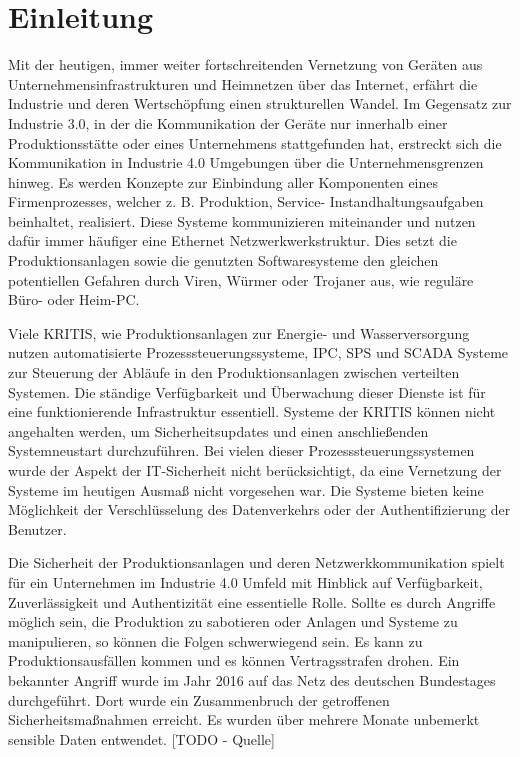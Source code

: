 \chapter{Einleitung}
Mit der heutigen, immer weiter fortschreitenden Vernetzung von Geräten aus Unternehmensinfrastrukturen und Heimnetzen über das Internet, erfährt die Industrie und deren Wertschöpfung einen strukturellen Wandel. Im Gegensatz zur Industrie 3.0, in der die Kommunikation der Geräte nur innerhalb einer Produktionsstätte oder eines Unternehmens stattgefunden hat, erstreckt sich die Kommunikation in Industrie 4.0 Umgebungen über die Unternehmensgrenzen hinweg. Es werden Konzepte zur Einbindung aller Komponenten eines Firmenprozesses, welcher z. B. Produktion, Service- Instandhaltungsaufgaben beinhaltet, realisiert. Diese Systeme kommunizieren miteinander und nutzen dafür immer häufiger eine Ethernet Netzwerkwerkstruktur. Dies setzt die Produktionsanlagen sowie die genutzten Softwaresysteme den gleichen potentiellen Gefahren durch Viren, Würmer oder Trojaner aus, wie reguläre Büro- oder Heim-PC.

Viele \ac{KRITIS}, wie Produktionsanlagen zur Energie- und Wasserversorgung nutzen automatisierte Prozesssteuerungssysteme, \ac{IPC}, \ac{SPS} und \ac{SCADA} Systeme zur Steuerung der Abläufe in den Produktionsanlagen zwischen verteilten Systemen. Die ständige Verfügbarkeit und Überwachung dieser Dienste ist für eine funktionierende Infrastruktur essentiell. Systeme der \ac{KRITIS} können nicht angehalten werden, um Sicherheitsupdates und einen anschließenden Systemneustart durchzuführen. Bei vielen dieser Prozesssteuerungssystemen wurde der Aspekt der IT-Sicherheit nicht berücksichtigt, da eine Vernetzung der Systeme im heutigen Ausmaß nicht vorgesehen war. Die Systeme bieten keine Möglichkeit der Verschlüsselung des Datenverkehrs oder der Authentifizierung der Benutzer.

Die Sicherheit der Produktionsanlagen und deren Netzwerkkommunikation spielt für ein Unternehmen im Industrie 4.0 Umfeld mit Hinblick auf Verfügbarkeit, Zuverlässigkeit und Authentizität eine essentielle Rolle. Sollte es durch Angriffe möglich sein, die Produktion zu sabotieren oder Anlagen und Systeme zu manipulieren, so können die Folgen schwerwiegend sein. Es kann zu Produktionsausfällen kommen und es können Vertragsstrafen drohen.
Ein bekannter Angriff wurde im Jahr 2016 auf das Netz des deutschen Bundestages durchgeführt. Dort wurde ein Zusammenbruch der getroffenen Sicherheitsmaßnahmen erreicht. Es wurden über mehrere Monate unbemerkt sensible Daten entwendet. [TODO - Quelle]

